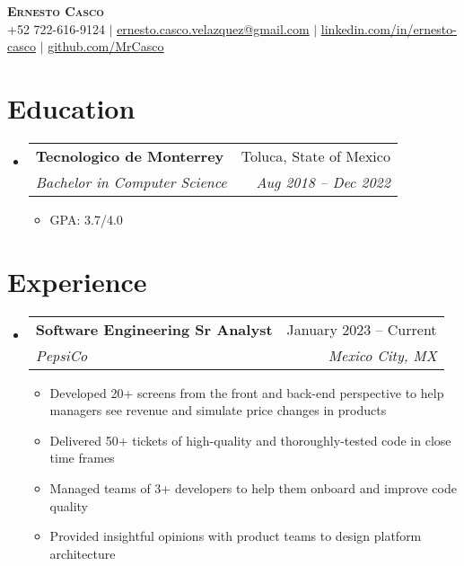 \documentclass[letterpaper,11pt]{article}
\makeatletter
\newcommand{\resumeItem}[1]{
  \item\small{
    {#1 \vspace{-2pt}}
  }
}
\newcommand{\resumeSubheading}[4]{
  \vspace{-2pt}\item
    \begin{tabular*}{0.97\textwidth}[t]{l@{\extracolsep{\fill}}r}
      \textbf{#1} & #2 \\
      \textit{\small#3} & \textit{\small #4} \\
    \end{tabular*}\vspace{-7pt}
}
\newcommand{\resumeSubHeadingListStart}{\begin{itemize}[leftmargin=0.15in, label={}]}
\newcommand{\resumeSubHeadingListEnd}{\end{itemize}}
\newcommand{\resumeItemListStart}{\begin{itemize}}
\newcommand{\resumeItemListEnd}{\end{itemize}\vspace{-5pt}}
\makeatother
\begin{document}

\begin{center}
    \textbf{\Huge \scshape Ernesto Casco} \\ \vspace{1pt}
    \small +52 722-616-9124 $|$ \href{mailto:ernesto.casco.velazquez@gmail.com}{\underline{ernesto.casco.velazquez@gmail.com}} $|$ 
    \href{https://linkedin.com/in/ernesto-casco}{\underline{linkedin.com/in/ernesto-casco}} $|$
    \href{https://github.com/MrCasco}{\underline{github.com/MrCasco}}
\end{center}


\section{Education}
  \resumeSubHeadingListStart
    \resumeSubheading
      {Tecnologico de Monterrey}{Toluca, State of Mexico}
      {Bachelor in Computer Science}{Aug 2018 -- Dec 2022}
    \resumeItemListStart
        \resumeItem{GPA: 3.7/4.0}
      \resumeItemListEnd
  \resumeSubHeadingListEnd

\section{Experience}
  \resumeSubHeadingListStart
   \resumeSubheading
      {Software Engineering Sr Analyst}{January 2023 -- Current}
      {PepsiCo}{Mexico City, MX}
      \resumeItemListStart
        \resumeItem{Developed 20+ screens from the front and back-end perspective to help managers see revenue and simulate price changes in products}
        \resumeItem{Delivered 50+ tickets of high-quality and thoroughly-tested code in close time frames}
        \resumeItem{Managed teams of 3+ developers to help them onboard and improve code quality}
        \resumeItem{Provided insightful opinions with product teams to design platform architecture}
      \resumeItemListEnd
  \resumeSubHeadingListEnd
\end{document}
